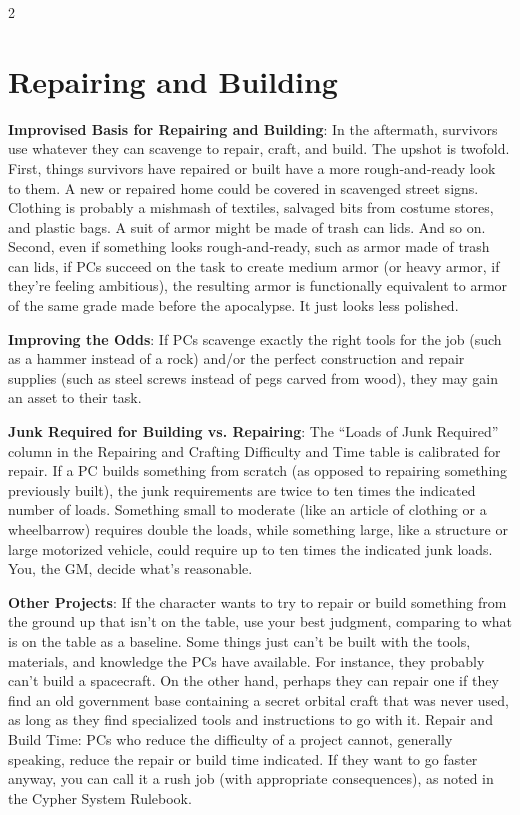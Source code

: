 \begin{multicols}{2}

\section{Repairing and Building}

\textbf{Improvised Basis for Repairing and Building}: In the aftermath, survivors use whatever they can scavenge to repair, craft, and build. The upshot is twofold. First, things survivors have repaired or built have a more rough‑and‑ready look to them. A new or repaired home could be covered in scavenged street signs. Clothing is probably a mishmash of textiles, salvaged bits from costume stores, and plastic bags. A suit of armor might be made of trash can lids. And so on. Second, even if something looks rough‑and‑ready, such as armor made of trash can lids, if PCs succeed on the task to create medium armor (or heavy armor, if they’re feeling ambitious), the resulting armor is functionally equivalent to armor of the same grade made before the apocalypse. It just looks less polished.

\textbf{Improving the Odds}: If PCs scavenge exactly the right tools for the job (such as a hammer instead of a rock) and/or the perfect construction and repair supplies (such as steel screws instead of pegs carved from wood), they may gain an asset to their task.

\textbf{Junk Required for Building vs. Repairing}: The “Loads of Junk Required” column in the Repairing and Crafting Difficulty and Time table is calibrated for repair. If a PC builds something from scratch (as opposed to repairing something previously built), the junk requirements are twice to ten times the indicated number of loads. Something small to moderate (like an article of clothing or a wheelbarrow) requires double the loads, while something large, like a structure or large motorized vehicle, could require up to ten times the indicated junk loads. You, the GM, decide what’s reasonable.

\textbf{Other Projects}: If the character wants to try to repair or build something from the ground up that isn’t on the table, use your best judgment, comparing to what is on the table as a baseline. Some things just can’t be built with the tools, materials, and knowledge the PCs have available. For instance, they probably can’t build a spacecraft. On the other hand, perhaps they can repair one if they find an old government base containing a secret orbital craft that was never used, as long as they find specialized tools and instructions to go with it.
Repair and Build Time: PCs who reduce the difficulty of a project cannot, generally speaking, reduce the repair or build time indicated. If they want to go faster anyway, you can call it a rush job (with appropriate consequences), as noted in the Cypher System Rulebook.


\end{multicols}
